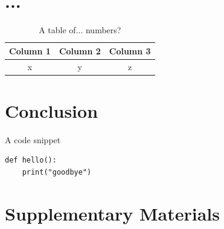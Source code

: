 \documentclass[a4paper,11pt]{article}
\begin{document}
\section{...}

\begin{table}[h!]
    \centering
    \caption{A table of... numbers?}
    \label{tab:numbers?}
    \begin{tabular}{ccc}
        \toprule
        Column 1 & Column 2 & Column 3 \\ \midrule
        x & y & z \\
        \bottomrule
    \end{tabular}
\end{table}

\section{Conclusion}
\begin{listing}[h!]
    \caption{A code snippet}
    \label{code:bye}
    \begin{verbatim}
def hello():
    print("goodbye")
    \end{verbatim}
\end{listing}

\pagebreak
\printbibliography


\pagebreak
\appendix

\section{Supplementary Materials}

\end{document}
